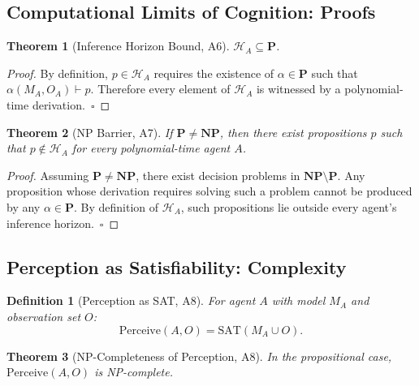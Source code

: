 \documentclass{article}
\newcommand{\Horizon}{\mathcal{H}}
\newcommand{\MA}{M_A}
\newtheorem{theorem}{Theorem}
\newtheorem{definition}{Definition}
\begin{document}
\subsection{Computational Limits of Cognition: Proofs}
\label{app:limits-proofs}

\begin{theorem}[Inference Horizon Bound, A6]
\label{thm:ha-p}
$\Horizon_A \subseteq \mathbf{P}$.
\end{theorem}

\begin{proof}
By definition, $p \in \Horizon_A$ requires the existence of $\alpha \in
\mathbf{P}$ such that $\alpha(\MA, O_A) \vdash p$.  Therefore every element
of $\Horizon_A$ is witnessed by a polynomial-time derivation.~$\square$
\end{proof}

\begin{theorem}[NP Barrier, A7]
\label{thm:np-barrier}
If $\mathbf{P} \neq \mathbf{NP}$, then there exist propositions $p$ such that
$p \notin \Horizon_A$ for every polynomial-time agent $A$.
\end{theorem}

\begin{proof}
Assuming $\mathbf{P} \neq \mathbf{NP}$, there exist decision problems in
$\mathbf{NP} \setminus \mathbf{P}$.  Any proposition whose derivation requires
solving such a problem cannot be produced by any $\alpha \in \mathbf{P}$.  By
definition of $\Horizon_A$, such propositions lie outside every agent's
inference horizon.~$\square$
\end{proof}

\subsection{Perception as Satisfiability: Complexity}
\label{app:sat-complexity}

\begin{definition}[Perception as SAT, A8]
For agent $A$ with model $\MA$ and observation set $O$:
\[
  \mathrm{Perceive}(A, O) = \mathrm{SAT}(\MA \cup O).
\]
\end{definition}

\begin{theorem}[NP-Completeness of Perception, A8]
\label{thm:perception-np}
In the propositional case, $\mathrm{Perceive}(A, O)$ is NP-complete.
\end{theorem}
\end{document}
